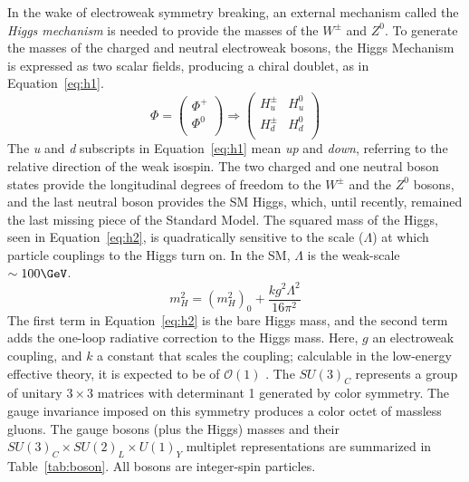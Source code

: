 In the wake of electroweak symmetry breaking, an external mechanism called the \textit{Higgs mechanism} is needed to provide the masses of the $W^\pm$ and $Z^0$.  To generate the masses of the charged and neutral electroweak bosons, the Higgs Mechanism is expressed as two scalar fields, producing a chiral doublet, as in Equation~\ref{eq:h1}.
\begin{equation}
\Phi= \begin{pmatrix}
\Phi^+ \\
\Phi^0 \\
\end{pmatrix} \Rightarrow
\begin{pmatrix}
H^\pm_u & H^0_u \\
H^\pm_d & H^0_d  \\
\end{pmatrix}
\label{eq:h1}
\end{equation}
The \textit{u} and \textit{d} subscripts in Equation~\ref{eq:h1} mean \textit{up} and \textit{down}, referring to the relative direction of the weak isospin.  The two charged and one neutral boson states provide the longitudinal degrees of freedom to the $W^\pm$ and the $Z^0$ bosons, and the last neutral boson provides the SM Higgs, which, until recently, remained the last missing piece of the Standard Model.  The squared mass of the Higgs, seen in Equation~\ref{eq:h2}, is quadratically sensitive to the scale ($\Lambda$) at which particle couplings to the Higgs turn on. In the SM, $\Lambda$ is the weak-scale $\sim 100\GeV$. 
 \begin{equation}
 m_H^2 = (m_H^2)_0+\frac{kg^2\Lambda^2}{16\pi^2}
 \label{eq:h2}
 \end{equation}
The first term in Equation~\ref{eq:h2} is the bare Higgs mass, and the second term adds the one-loop radiative correction to the Higgs mass.  Here, $g$ an electroweak coupling, and $k$ a constant that scales the coupling; calculable in the low-energy effective theory, it is expected to be of $\mathcal{O}(1)$ \cite{haber}. 
The $SU(3)_C$ represents a group of unitary $3\times3$ matrices with determinant 1 generated by color symmetry.  The gauge invariance imposed on this symmetry produces a color octet of massless gluons.  The gauge bosons (plus the Higgs) masses and their $SU(3)_{C} \times SU(2)_{L} \times U(1)_{Y}$ multiplet representations are summarized in Table~\ref{tab:boson}.  All bosons are integer-spin particles.      
